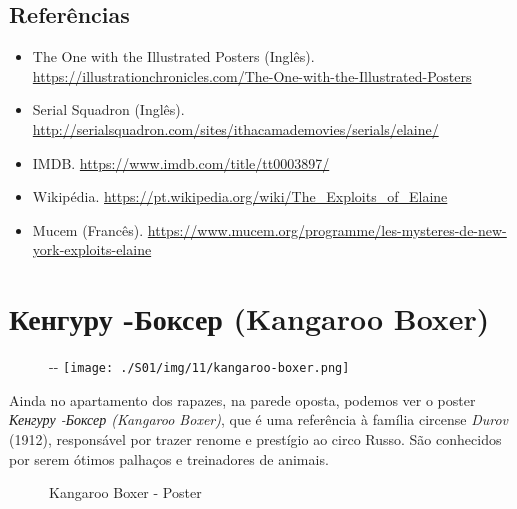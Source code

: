 \hypertarget{referuxeancias-2}{%
\subsection{Referências}\label{referuxeancias-2}}

\begin{itemize}
\tightlist
\item
  \sloppy The One with the Illustrated Posters (Inglês). \url{https://illustrationchronicles.com/The-One-with-the-Illustrated-Posters}
\item
  \sloppy Serial Squadron (Inglês). \url{http://serialsquadron.com/sites/ithacamademovies/serials/elaine/}
\item
  \sloppy IMDB. \url{https://www.imdb.com/title/tt0003897/}
\item
  \sloppy Wikipédia. \url{https://pt.wikipedia.org/wiki/The_Exploits_of_Elaine}
\item
  \sloppy Mucem (Francês). \url{https://www.mucem.org/programme/les-mysteres-de-new-york-exploits-elaine}
\end{itemize}

\hypertarget{ux43aux435ux43dux433ux443ux440ux443--ux431ux43eux43aux441ux435ux440-kangaroo-boxer}{%
\section{Кенгуру -Боксер (Kangaroo
Boxer)}\label{ux43aux435ux43dux433ux443ux440ux443--ux431ux43eux43aux441ux435ux440-kangaroo-boxer}}

\begin{figure}[!ht]
  \begin{adjustwidth}{-\oddsidemargin-1in}{-\rightmargin}
    \centering
    \texttt{[image: ./S01/img/11/kangaroo-boxer.png]}
  \end{adjustwidth}
\end{figure}

Ainda no apartamento dos rapazes, na parede oposta, podemos ver o poster
\emph{Кенгуру -Боксер (Kangaroo Boxer)}, que é uma referência à família
circense \emph{Durov} (1912), responsável por trazer renome e prestígio
ao circo Russo. São conhecidos por serem ótimos palhaços e treinadores
de animais.

\begin{figure}
  \centering
    \caption{Kangaroo Boxer - Poster\label{fig:kangaroo-boxer-poster}}
\end{figure}

